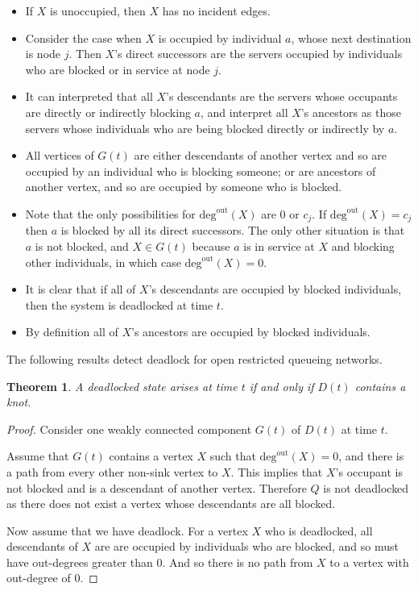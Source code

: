 \documentclass{article}
\newtheorem{theorem}{Theorem}
\begin{document}
\begin{itemize}

  \item If $X$ is unoccupied, then $X$ has no incident edges.
  \item Consider the case when $X$ is occupied by individual $a$, whose next destination is node $j$. Then $X$'s direct successors are the servers occupied by individuals who are blocked or in service at node $j$.
  \item It can interpreted that all $X$'s descendants are the servers whose occupants are directly or indirectly blocking $a$, and interpret all $X$'s ancestors as those servers whose individuals who are being blocked directly or indirectly by $a$.
  \item All vertices of $G(t)$ are either descendants of another vertex and so are occupied by an individual who is blocking someone; or are ancestors of another vertex, and so are occupied by someone who is blocked.
  \item Note that the only possibilities for $\text{deg}^{\text{out}}(X)$ are 0 or $c_j$. If $\text{deg}^{\text{out}}(X) = c_j$ then $a$ is blocked by all its direct successors. The only other situation is that $a$ is not blocked, and $X \in G(t)$ because $a$ is in service at $X$ and blocking other individuals, in which case $\text{deg}^{\text{out}}(X) = 0$.
  \item It is clear that if all of $X$'s descendants are occupied by blocked individuals, then the system is deadlocked at time $t$.
  \item By definition all of $X$'s ancestors are occupied by blocked individuals.

\end{itemize}

The following results detect deadlock for open restricted queueing networks.\\

\begin{theorem}
A deadlocked state arises at time $t$ if and only if $D(t)$ contains a knot.
\end{theorem}

\begin{proof}
Consider one weakly connected component $G(t)$ of $D(t)$ at time $t$.

Assume that $G(t)$ contains a vertex $X$ such that $\text{deg}^{\text{out}}(X) = 0$, and there is a path from every other non-sink vertex to $X$.
This implies that $X$'s occupant is not blocked and is a descendant of another vertex.
Therefore $Q$ is not deadlocked as there does not exist a vertex whose descendants are all blocked.

Now assume that we have deadlock.
For a vertex $X$ who is deadlocked, all descendants of $X$ are are occupied by individuals who are blocked, and so must have out-degrees greater than 0.
And so there is no path from $X$ to a vertex with out-degree of 0.

\end{proof}
\end{document}
